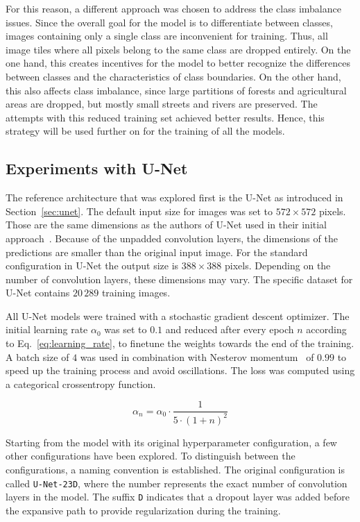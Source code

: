 For this reason, a different approach was chosen to address the class imbalance issues. Since the overall goal for the model is to differentiate between classes, images containing only a single class are inconvenient for training. Thus, all image tiles where all pixels belong to the same class are dropped entirely. On the one hand, this creates incentives for the model to better recognize the differences between classes and the characteristics of class boundaries. On the other hand, this also affects class imbalance, since large partitions of forests and agricultural areas are dropped, but mostly small streets and rivers are preserved. The attempts with this reduced training set achieved better results. Hence, this strategy will be used further on for the training of all the models.

\subsection{Experiments with U-Net}
\label{sec:unet_experiments}
The reference architecture that was explored first is the U-Net as introduced in Section~\ref{sec:unet}. The default input size for images was set to $572\times 572$ pixels. Those are the same dimensions as the authors of U-Net used in their initial approach~\cite{unet15}. Because of the unpadded convolution layers, the dimensions of the predictions are smaller than the original input image. For the standard configuration in U-Net the output size is $388\times 388$ pixels. Depending on the number of convolution layers, these dimensions may vary. The specific dataset for U-Net contains $20\,289$ training images.

All U-Net models were trained with a stochastic gradient descent optimizer. The initial learning rate $\alpha_0$ was set to $0.1$ and reduced after every epoch $n$ according to Eq.~\ref{eq:learning_rate}, to finetune the weights towards the end of the training. A batch size of $4$ was used in combination with Nesterov momentum~\cite{nesterov83} of $0.99$ to speed up the training process and avoid oscillations. The loss was computed using a categorical crossentropy function.

\begin{equation}
    \alpha_n = \alpha_0 \cdot \frac{1}{5 \cdot (1 + n)^2}
    \label{eq:learning_rate}
\end{equation}

Starting from the model with its original hyperparameter configuration, a few other configurations have been explored. To distinguish between the configurations, a naming convention is established. The original configuration is called \texttt{U-Net-23D}, where the number represents the exact number of convolution layers in the model. The suffix \texttt{D} indicates that a dropout layer was added before the expansive path to provide regularization during the training.

